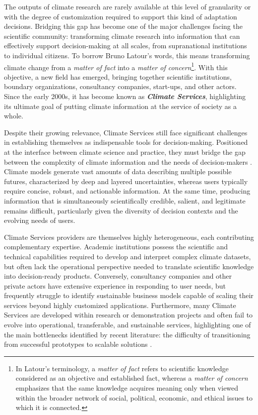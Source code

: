 The outputs of climate research are rarely available at this level of granularity or with the degree of customization required to support this kind of adaptation decisions. Bridging this gap has become one of the major challenges facing the scientific community: transforming climate research into information that can effectively support decision-making at all scales, from supranational institutions to individual citizens. To borrow Bruno Latour's words, this means transforming climate change from a \textit{matter of fact} into a \textit{matter of concern}\footnote{In Latour's terminology, a \textit{matter of fact} refers to scientific knowledge considered as an objective and established fact, whereas a \textit{matter of concern} emphasizes that the same knowledge acquires meaning only when viewed within the broader network of social, political, economic, and ethical issues to which it is connected.}. With this objective, a new field has emerged, bringing together scientific institutions, boundary organizations, consultancy companies, start-ups, and other actors. Since the early 2000s, it has become known as \textbf{\textit{Climate Services}}, highlighting its ultimate goal of putting climate information at the service of society as a whole.

Despite their growing relevance, Climate Services still face significant challenges in establishing themselves as indispensable tools for decision-making. Positioned at the interface between climate science and practice, they must bridge the gap between the complexity of climate information and the needs of decision-makers \citep{jacobs_next_2020}. Climate models generate vast amounts of data describing multiple possible futures, characterized by deep and layered uncertainties, whereas users typically require concise, robust, and actionable information. At the same time, producing information that is simultaneously scientifically credible, salient, and legitimate remains difficult, particularly given the diversity of decision contexts and the evolving needs of users.

Climate Services providers are themselves highly heterogeneous, each contributing complementary expertise. Academic institutions possess the scientific and technical capabilities required to develop and interpret complex climate datasets, but often lack the operational perspective needed to translate scientific knowledge into decision-ready products. Conversely, consultancy companies and other private actors have extensive experience in responding to user needs, but frequently struggle to identify sustainable business models capable of scaling their services beyond highly customized applications. Furthermore, many Climate Services are developed within research or demonstration projects and often fail to evolve into operational, transferable, and sustainable services, highlighting one of the main bottlenecks identified by recent literature: the difficulty of transitioning from successful prototypes to scalable solutions \citep{guentchev_upscaling_2023}. 

